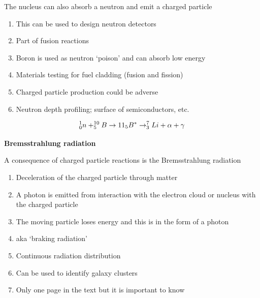 \documentclass[aspectratio=1610,pdftex,dvipsnames,compress,xcolor={dvipsnames}]{beamer}
\begin{document}
\addtocounter{framenumber}{-1} 
\begin{frame}{The nucleus can also absorb a neutron and emit a charged particle}
    \begin{enumerate}[series=outerlist,topsep=0pt,itemsep=21pt,leftmargin=*,label=(\arabic*)]
        \item[]This can be used to design neutron detectors
        \item[]Part of fusion reactions
        \item[]Boron is used as neutron `poison' and can absorb low energy 
        \item[]Materials testing for fuel cladding (fusion and fission)
        \item[]Charged particle production could be adverse
        \item[]Neutron depth profiling; surface of semiconductors, etc.
    \end{enumerate}

    \vspace*{\fill}

    \begin{equation}
        \LARGE
        ^{1}_{0}n + ^{10}_{5}B \rightarrow {11}_{5}B^{*} \rightarrow ^{7}_{3}Li + \alpha + \gamma
    \end{equation}

\end{frame}


\begin{frame}[plain]{}
    \centering\LARGE\textbf{Bremsstrahlung radiation}
\end{frame}


\addtocounter{framenumber}{-1} 
\begin{frame}{A consequence of charged particle reactions is the Bremsstrahlung radiation}
    \begin{enumerate}[series=outerlist,topsep=0pt,itemsep=21pt,leftmargin=*,label=(\arabic*)]
        \item[]Deceleration of the charged particle through matter
        \item[]A photon is emitted from interaction with the electron cloud or nucleus with the charged particle
        \item[]The moving particle loses energy and this is in the form of a photon
        \item[]aka `braking radiation'
        \item[]Continuous radiation distribution
        \item[]Can be used to identify galaxy clusters
        \item[]Only one page in the text but it is important to know
    \end{enumerate}
\end{frame}
\end{document}
